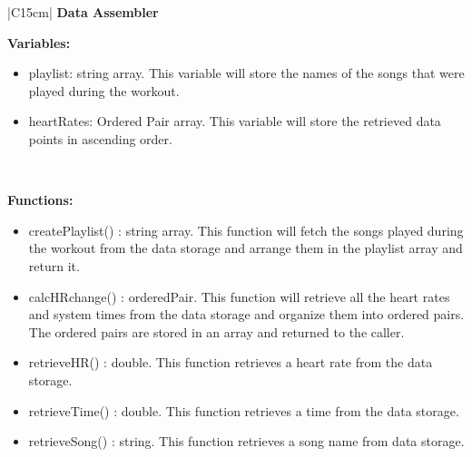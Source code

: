 \begin{center}
    \begin{tabular}{|C{15cm}|}
        \hline
            \textbf{Data Assembler} \\
        \hline
            \begin{flushleft}
                \textbf{Variables:} \\
            \end{flushleft}
                \begin{itemize}
                    \item playlist: string array. This variable will store the names of the songs that were played during the workout.
                    \item heartRates: Ordered Pair array. This variable will store the retrieved data points in ascending order.
                \end{itemize} \\
            \hline
            \begin{flushleft}
                \textbf{Functions: } \\
            \end{flushleft}
                \begin{itemize}
                    \item createPlaylist() : string array. This function will fetch the songs played during the workout from the data storage and arrange them in the playlist array and return it.
                    \item calcHRchange() : orderedPair. This function will retrieve all the heart rates and system times from the data storage and organize them into ordered pairs. The ordered pairs are stored in an array and returned to the caller.
                    \item retrieveHR() : double. This function retrieves a heart rate from the data storage.
                    \item retrieveTime() : double. This function retrieves a time from the data storage.
                    \item retrieveSong() : string. This function retrieves a song name from data storage.
                \end{itemize}
                \\
            \hline
    \end{tabular}
\end{center}

